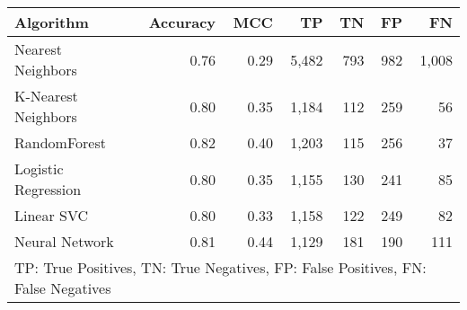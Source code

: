\begin{tabular}{lrrrrrr}
    \toprule
    \textbf{Algorithm}  & \textbf{Accuracy} & \textbf{MCC}  & \textbf{TP}   & \textbf{TN}   & \textbf{FP} &\textbf{FN}\\
    \midrule
    Nearest Neighbors   & 0.76  & 0.29  & 5,482  & 793  & 982  & 1,008  \\
    K-Nearest Neighbors & 0.80  & 0.35  & 1,184  & 112  & 259  & 56  \\
    RandomForest        & 0.82  & 0.40  & 1,203  & 115  & 256  & 37  \\
    Logistic Regression & 0.80  & 0.35  & 1,155  & 130  & 241  & 85  \\
    Linear SVC          & 0.80  & 0.33  & 1,158  & 122  & 249  & 82  \\
    Neural Network      & 0.81  & 0.44  & 1,129  & 181  & 190  & 111  \\
    \bottomrule
    \multicolumn{7}{l}{\tiny{TP: True Positives, TN: True Negatives, FP: False Positives, FN: False Negatives}}
\end{tabular}

